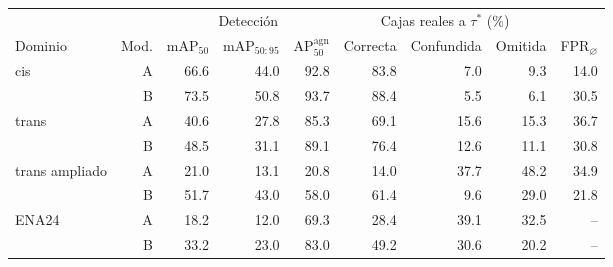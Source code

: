\begin{tabular}{lrrrrrrrr}
\toprule
 & & \multicolumn{3}{c}{Detección} & \multicolumn{3}{c}{Cajas reales a $\tau^\ast$ (\%)} & \\ \cmidrule(lr){3-5}\cmidrule(lr){6-8}
Dominio & Mod. & mAP$_{50}$ & mAP$_{50:95}$ & AP$_{50}^{\mathrm{agn}}$ & Correcta & Confundida & Omitida & FPR$_{\varnothing}$ \\
\midrule
cis & A & 66.6 & 44.0 & 92.8 & 83.8 & 7.0 & 9.3 & 14.0 \\
 & B & 73.5 & 50.8 & 93.7 & 88.4 & 5.5 & 6.1 & 30.5 \\
\midrule
trans & A & 40.6 & 27.8 & 85.3 & 69.1 & 15.6 & 15.3 & 36.7 \\
 & B & 48.5 & 31.1 & 89.1 & 76.4 & 12.6 & 11.1 & 30.8 \\
\midrule
trans ampliado & A & 21.0 & 13.1 & 20.8 & 14.0 & 37.7 & 48.2 & 34.9 \\
 & B & 51.7 & 43.0 & 58.0 & 61.4 & 9.6 & 29.0 & 21.8 \\
\midrule
ENA24 & A & 18.2 & 12.0 & 69.3 & 28.4 & 39.1 & 32.5 & -- \\
 & B & 33.2 & 23.0 & 83.0 & 49.2 & 30.6 & 20.2 & -- \\
\bottomrule
\end{tabular}

